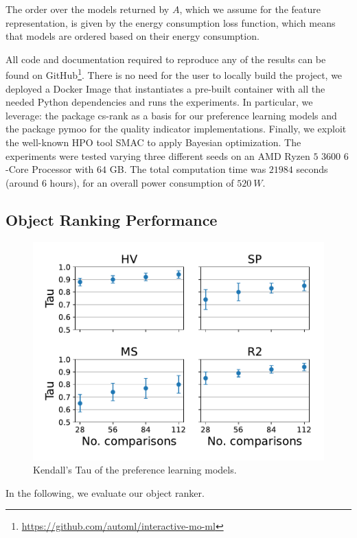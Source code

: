 The order over the models returned by $A$, which we assume for the feature representation, is given by the energy consumption loss function, which means that models are ordered based on their energy consumption.

All code and documentation required to reproduce any of the results can be found on GitHub\footnote{\url{https://github.com/automl/interactive-mo-ml}}.
There is no need for the user to locally build the project, we deployed a Docker Image that instantiates a pre-built container with all the needed Python dependencies and runs the experiments.
In particular, we leverage: the package cs-rank \cite{csrank2018, csrank2019} as a basis for our preference learning models and the package pymoo\cite{pymoo} for the quality indicator implementations.
Finally, we exploit the well-known HPO tool SMAC \cite{hutter-lion11a,lindauer-jmlr22a} to apply Bayesian optimization.
The experiments were tested varying three different seeds on an AMD Ryzen $5$ $3600$ $6$-Core Processor with $64$ GB.
The total computation time was $21984$ seconds (around $6$ hours), for an overall power consumption of $520~W$.

\subsection{Object Ranking Performance}

\begin{figure}[t]
\centering
\includegraphics[width=0.7\columnwidth]{chapters/human-centric/moo/img/preference_evaluation.pdf}
\caption{Kendall's Tau of the preference learning models.}
\label{moo-fig:preference_evaluation}
\end{figure}

In the following, we evaluate our object ranker.

